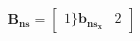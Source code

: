 \documentclass[preview]{standalone}
\begin{document}
\begin{align*}
{\mathbf{B_{ns}} = \begin{bmatrix} 1 \} \mathbf{b}_{\mathbf{ns_x}}&  2 \end{bmatrix}}
\end{align*}
\end{document}
